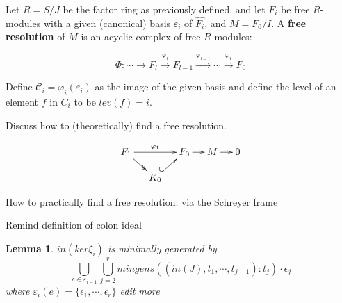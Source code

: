 \documentclass{article}
\newtheorem{lemma}[theorem]{Lemma}
\theoremstyle{definition}
\theoremstyle{remark}
\theoremstyle{example}
\begin{document}
Let $R = S/J$ be the factor ring as previously defined, and let $F_i$ be free $R$-modules with a given (canonical) basis $\varepsilon_{i}$ of $\hat{F_i}$, and $M = F_0/I$.  A \textbf{free resolution} of $M$ is an acyclic complex of free $R$-modules:

\begin{equation}
    \Phi: \cdots \rightarrow F_l \xrightarrow{\varphi_l} F_{l-1} \xrightarrow{\varphi_{l-1}} \cdots \xrightarrow{\varphi_1} F_0
\end{equation}

Define $\mathcal{C}_i = \varphi_i(\varepsilon_i)$ as the image of the given basis and define the level of an element $f$ in $C_i$ to be $lev(f) = i$.

\textcolor{BrickRed}{Discuss how to (theoretically) find a free resolution}.

$$
\xymatrix@C=1pc@R=1pc{
F_1 \ar@{->>}[dr] \ar[rr]^{\varphi_1} &                      &  F_0 \ar[r] & M \ar[r] & 0\\
            & K_0 \ar@{^{(}->}[ur]  &             &          & \\
}
$$

\textcolor{BrickRed}{How to practically find a free resolution: via the Schreyer frame}

\textcolor{BrickRed}{Remind definition of colon ideal}
\begin{lemma}\label{lem:mingens}
    $in(ker\xi_i)$ is minimally generated by
    \begin{equation}
        \bigcup_{e\in{\varepsilon}_{i-1}}{\bigcup_{j = 2}^{r}{mingens((in(J),t_1,\cdots,t_{j-1}):t_j)\cdot \epsilon_j}}
    \end{equation}
    where $\varepsilon_i(e) = \{\epsilon_1,\cdots,\epsilon_r\}$
    \textcolor{BrickRed}{edit more}
\end{lemma}
\end{document}
